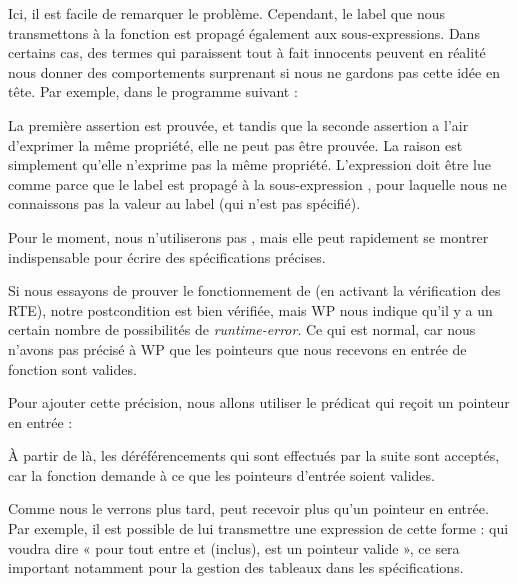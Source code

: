 

Ici, il est facile de remarquer le problème. Cependant, le label que nous
transmettons à la fonction  est propagé également
aux sous-expressions. Dans certains cas, des termes qui paraissent tout à fait
innocents peuvent en réalité nous donner des comportements surprenant si nous
ne gardons pas cette idée en tête. Par exemple, dans le programme suivant :




La première assertion est prouvée, et tandis que la seconde assertion a l'air
d'exprimer la même propriété, elle ne peut pas être prouvée. La raison est
simplement qu'elle n'exprime pas la même propriété. L'expression
 doit être lue comme
 parce que le
label est propagé à la sous-expression , pour laquelle nous ne
connaissons pas la valeur au label  (qui n'est pas spécifié).


Pour le moment, nous n'utiliserons pas , mais
elle peut rapidement se montrer indispensable pour écrire des spécifications
précises.





Si nous essayons de prouver le fonctionnement de  (en activant
la vérification des RTE), notre postcondition est bien vérifiée, mais WP nous
indique qu'il y a un certain nombre de possibilités de \textit{runtime-error}. Ce qui
est normal, car nous n'avons pas précisé à WP que les pointeurs que nous
recevons en entrée de fonction sont valides.



Pour ajouter cette précision, nous allons utiliser le prédicat  qui
reçoit un pointeur en entrée :






À partir de là, les déréférencements qui sont effectués par la suite sont
acceptés, car la fonction demande à ce que les pointeurs d'entrée soient
valides.



Comme nous le verrons plus tard,  peut recevoir plus qu'un
pointeur en entrée. Par exemple, il est possible de lui transmettre une
expression de cette forme :  qui voudra dire « pour
tout  entre  et  (inclus),  est un pointeur valide », ce sera important
notamment pour la gestion des tableaux dans les spécifications.



